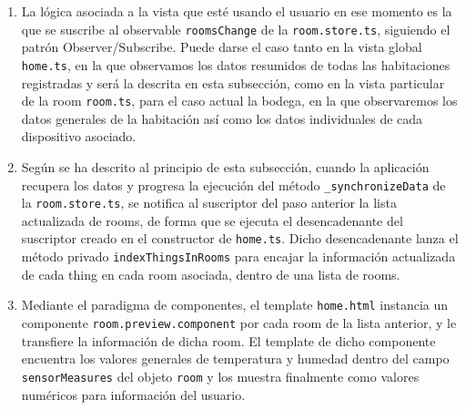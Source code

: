 \begin{enumerate}
\item La lógica asociada a la vista que esté usando el usuario en ese momento es la que se suscribe al observable \verb|roomsChange| de la \verb|room.store.ts|, siguiendo el patrón Observer/Subscribe. Puede darse el caso tanto en la vista global \verb|home.ts|, en la que observamos los datos resumidos de todas las habitaciones registradas y será la descrita en esta subsección, como en la vista particular de la room \verb|room.ts|, para el caso actual la bodega, en la que observaremos los datos generales de la habitación así como los datos individuales de cada dispositivo asociado.
\item Según se ha descrito al principio de esta subsección, cuando la aplicación recupera los datos y progresa la ejecución del método \verb|_synchronizeData| de la \verb|room.store.ts|, se notifica al suscriptor del paso anterior la lista actualizada de rooms, de forma que se ejecuta el desencadenante del suscriptor creado en el constructor de \verb|home.ts|. Dicho desencadenante lanza el método privado \verb|indexThingsInRooms| para encajar la información actualizada de cada thing en cada room asociada, dentro de una lista de rooms.
\item Mediante el paradigma de componentes, el template \verb|home.html| instancia un componente \verb|room.preview.component| por cada room de la lista anterior, y le transfiere la información de dicha room. El template de dicho componente encuentra los valores generales de temperatura y humedad dentro del campo \verb|sensorMeasures| del objeto \verb|room| y los muestra finalmente como valores numéricos para información del usuario.
\end{enumerate}